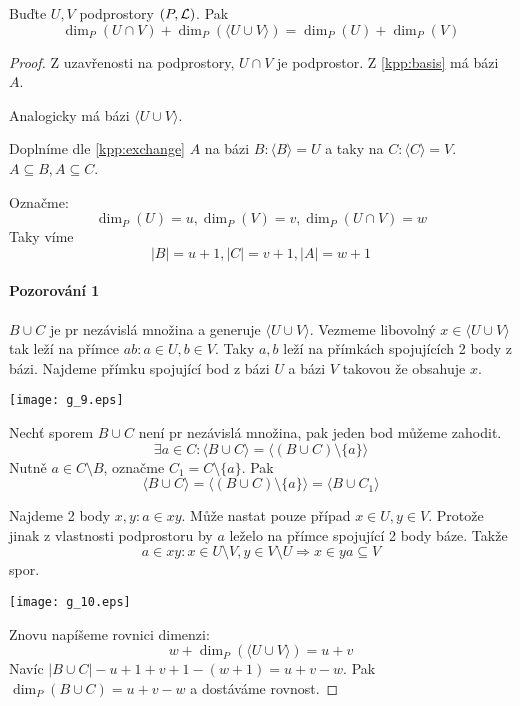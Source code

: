 \begin{theorem}\label{kpp:dim_join_inter}
    Buďte $U,V$ podprostory $(P,\operatorname{\mathcal{L}})$.
    Pak
    \[ \dim_P(U \cap V) + \dim_P(\langle U \cup V \rangle) = \dim_P(U)+\dim_P(V) \]
\end{theorem}
\begin{proof}
	Z uzavřenosti na podprostory, $U \cap V$ je podprostor.
	Z \cref{kpp:basis} má bázi $A$.

	Analogicky má bázi $\langle U \cup V \rangle$.

	Doplníme dle \cref{kpp:exchange} $A$ na bázi $B: \langle B \rangle = U$ a taky na $C: \langle C \rangle = V$.
	$ A \subseteq B, A \subseteq C$.

	Označme:
	\[ \dim_P (U) = u, \dim_P (V) = v, \dim_P (U \cap V) = w \]
	Taky víme
	\[ |B| = u + 1, |C| = v + 1, |A| = w + 1 \]
	\paragraph{Pozorování 1} $B \cup C$ je pr nezávislá množina a generuje $\langle U \cup V \rangle$.
	Vezmeme libovolný $x \in \langle U \cup V \rangle$ tak leží na přímce $ab: a \in U, b \in V$.
	Taky $a, b$ leží na přímkách spojujících 2 body z bázi.
	Najdeme přímku spojující bod z bázi $U$ a bázi $V$ takovou že obsahuje $x$.

    	\texttt{[image: g\_9.eps]}

	Nechť sporem $B \cup C$ není pr nezávislá množina, pak jeden bod můžeme zahodit.
	\[ \exists a \in C: \langle B \cup C \rangle = \langle (B \cup C) \setminus \{ a \} \rangle \]
	Nutně $a \in C \setminus B$, označme $C_1 = C \setminus \{ a \}$.
	Pak
	\[ \langle B \cup C \rangle = \langle (B \cup C) \setminus \{ a \} \rangle = \langle B \cup C_1 \rangle \]

	Najdeme 2 body $x, y: a \in xy$.
	Může nastat pouze případ $x \in U, y \in V$.
	Protože jinak z vlastnosti podprostoru by $a$ leželo na přímce spojující 2 body báze.
	Takže
	\[ a \in xy: x \in U \setminus V, y \in V \setminus U \Rightarrow x \in ya \subseteq V \]
	spor.

    	\texttt{[image: g\_10.eps]}

	Znovu napíšeme rovnici dimenzi:
	\[ w + \dim_P(\langle U \cup V \rangle) = u + v \]
	Navíc $|B \cup C| - u + 1 + v + 1 - (w + 1) = u + v - w $.
	Pak $\dim_P (B \cup C) = u + v - w$ a dostáváme rovnost.
\end{proof}

